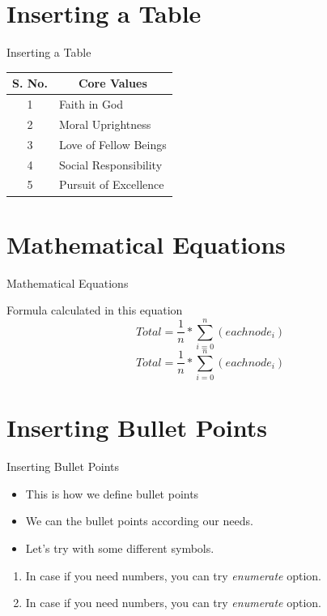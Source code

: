 \documentclass[12pt, aspectration=54]{beamer}
\begin{document}
\section{Inserting a Table}
\begin{frame}{Inserting a Table}
\begin{table}[]
\begin{tabular}{|c|l|}
\hline
\textbf{S. No.} & \multicolumn{1}{c|}{\textbf{Core Values}} \\ \hline
1 & Faith in God \\ \hline
2 & Moral Uprightness \\ \hline
3 & Love of Fellow Beings \\ \hline
4 & Social Responsibility \\ \hline
5 & Pursuit of Excellence \\ \hline
\end{tabular}
\end{table}
\end{frame}

\section{Mathematical Equations}
\begin{frame}{Mathematical Equations}
    \begin{block}{Formula}
    calculated in this equation
    \begin{equation}    %
            Total = \frac{1}{n}*\sum_{i=0}^n (eachnode_i)
    \end{equation}
    \begin{equation}    %
            Total = \frac{1}{n}*\sum_{i=0}^n (eachnode_i)
    \end{equation}
\end{block}
\end{frame}

\section{Inserting Bullet Points}
\begin{frame}{Inserting Bullet Points}
    \begin{itemize}
        \item This is how we define bullet points
        \item[*] We can the bullet points according our needs.
        \item[\$] Let's try with some different symbols.
    \end{itemize}
\vspace{.5cm}
    \begin{enumerate}
        \item In case if you need numbers, you can try \textit{enumerate} option.
        \item In case if you need numbers, you can try \textit{enumerate} option.
    \end{enumerate}
\end{frame}
\end{document}
